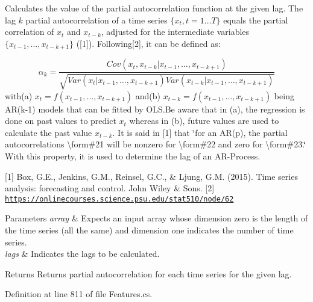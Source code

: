 Calculates the value of the partial autocorrelation function at the given lag. The lag $k$ partial autocorrelation of a time series $\lbrace x_t, t = 1 \ldots T \rbrace$ equals the partial correlation of $x_t$ and $x_{t-k}$, adjusted for the intermediate variables $\lbrace x_ { t-1}, \ldots, x_{t-k+1} \rbrace$ (\mbox{[}1\mbox{]}). Following\mbox{[}2\mbox{]}, it can be defined as\+: 

\[ \alpha_k = \frac{ Cov(x_t, x_{ t - k} | x_{t-1}, \ldots, x_{t-k+1})} {\sqrt{ Var(x_t | x_{ t - 1}, \ldots, x_{t-k+1}) Var(x_{ t - k} | x_{t-1}, \ldots, x_{t-k+1} )}} \] with(a) $x_t = f(x_{ t - 1}, \ldots, x_{t-k+1})$ and(b) $ x_{t-k} = f(x_{ t - 1}, \ldots, x_{t-k+1})$ being AR(k-\/1) models that can be fitted by O\+L\+S.\+Be aware that in (a), the regression is done on past values to predict $ x_t $ whereas in (b), future values are used to calculate the past value $x_{t-k}$. It is said in \mbox{[}1\mbox{]} that \char`\"{}for an A\+R(p), the partial autocorrelations \textbackslash{}form\#21 will be nonzero for \textbackslash{}form\#22
 and zero for \textbackslash{}form\#23.\char`\"{} With this property, it is used to determine the lag of an A\+R-\/\+Process.

\mbox{[}1\mbox{]} Box, G.\+E., Jenkins, G.\+M., Reinsel, G.\+C., \& Ljung, G.\+M. (2015). Time series analysis\+: forecasting and control. John Wiley \& Sons. \mbox{[}2\mbox{]} \href{https://onlinecourses.science.psu.edu/stat510/node/62}{\tt https\+://onlinecourses.\+science.\+psu.\+edu/stat510/node/62} 


\begin{DoxyParams}{Parameters}
{\em array} & Expects an input array whose dimension zero is the length of the time series (all the same) and dimension one indicates the number of time series.\\
\hline
{\em lags} & Indicates the lags to be calculated.\\
\hline
\end{DoxyParams}
\begin{DoxyReturn}{Returns}
Returns partial autocorrelation for each time series for the given lag.
\end{DoxyReturn}


Definition at line 811 of file Features.\+cs.

\mbox{\label{classkhiva_1_1features_1_1_features_a3405f05243a79947dd4aab24b63a38d5}} 
